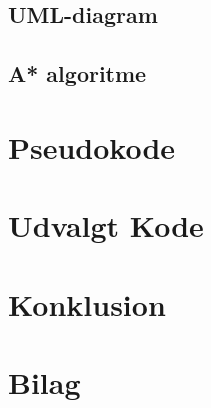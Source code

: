 \documentclass[12pt]{article}
\begin{document}
\subsection{UML-diagram}
\subsection{A* algoritme}


\section{Pseudokode}
\section{Udvalgt Kode}
\section{Konklusion}
\section{Bilag}

\end{document}
